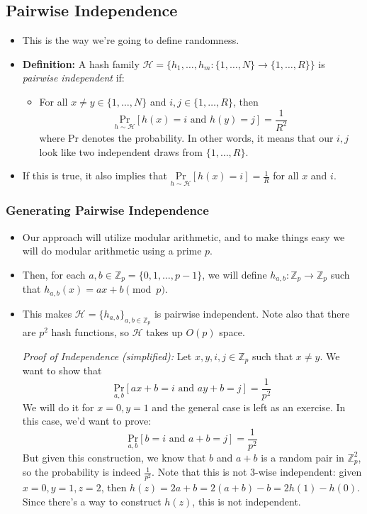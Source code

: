 \subsection{Pairwise Independence}
\begin{itemize}
	\item This is the way we're going to define randomness.
	\item \textbf{Definition:} A hash family \( \mathcal H = \{h_1, \dots, h_m : \{1, \dots, N\} \to 
		\{1, \dots, R\}	\} \) is \textit{pairwise independent} if:
		\begin{itemize}
			\item For all \( x \neq y \in \{1, \dots, N\}  \) and \( i, j \in \{1, \dots, R\}  \), then 
				\[
					\underset{h\sim \mathcal H}{\mathrm{Pr}}\left[ h(x) = i \text{ and } h(y) = j \right]  
					= \frac{1}{R^2}
				\] 
				where Pr denotes the probability. In other words, it means that our \( i, j \) look like 
				two independent draws from \( \{1, \dots, R\}  \). 
		\end{itemize}
	\item If this is true, it also implies that \( \underset{h \sim \mathcal H}{\mathrm{Pr}}[h(x) = i] =\frac{1}{R} \) for all \( x \) and \( i \).
\end{itemize}
\subsubsection{Generating Pairwise Independence}
\begin{itemize}
	\item Our approach will utilize modular arithmetic, and to make things easy we will do modular arithmetic 
		using a prime \( p \). 
	\item Then, for each \( a, b \in \mathbb{Z}_p = \{0, 1, \dots, p-1\}\), we will define \( h_{a, b}: 
		\mathbb Z_p \to 
		\mathbb Z_p\) such that \( h_{a, b}(x) = ax + b \pmod p\). 
	\item This makes \( \mathcal H = \{h_{a, b}\} _{a, b \in \mathbb Z_p} \) is pairwise independent. Note 
		also that there are \( p^2 \) hash functions, so \( \mathcal H \) takes up \( O(p) \) space.   


		\textit{Proof of Independence (simplified):} Let  \( x, y, i, j \in \mathbb Z_p \) 
		such that \( x \neq y \). We want to show that 
		\[
			\underset{a, b}{\mathrm{Pr}}[ax + b = i \text{ and } ay + b = j] = \frac{1}{p^2}
		\] 
		We will do it for \( x = 0, y = 1 \) and the general case is left as an 
		exercise. In this case, we'd want to prove:
		\[
			\underset{a, b}{\mathrm{Pr}}[b = i \text{ and } a+ b = j] = \frac{1}{p^2}
		\] 
		But given this construction, we know that \( b \) and \( a + b \) is a random pair in \( \mathbb Z_p^2 \),
		so the probability is indeed \( \frac{1}{p^2} \). Note that this is not 3-wise independent: given 
		\( x =0, y = 1, z = 2 \), then \( h(z) = 2a + b = 2(a + b) - b = 2h(1) - h(0) \). Since there's 
		a way to construct \( h(z)  \), this is not independent.
\end{itemize}
